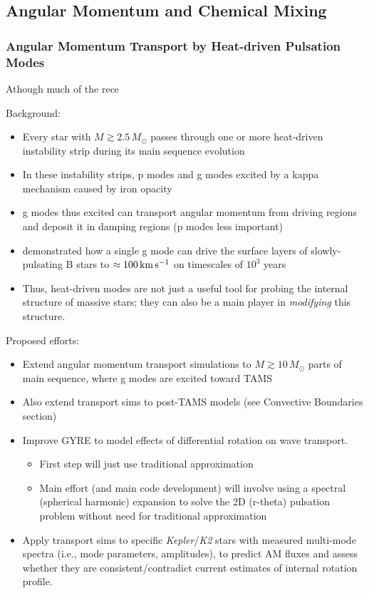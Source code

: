 
\subsection{Angular Momentum and Chemical Mixing}



{\color{brown}
\subsubsection{Angular Momentum Transport by Heat-driven Pulsation Modes}

Athough much of the rece

Background:
 \begin{itemize}
 \item Every star with $M \gtrsim 2.5\,M_{\odot}$ passes through one or more heat-driven instability strip during its main sequence evolution
 \item In these instability strips, p modes and g modes excited by a kappa mechanism caused by iron opacity
 \item g modes thus excited can transport angular momentum from driving regions and deposit it in damping regions (p modes less important)
 \item \citet{Townsend:2017aa} demonstrated how a single g mode can drive the surface layers of slowly-pulsating B stars to $\approx 100\,{\rm km\,s^{-1}}$ on timescales of $10^{3}$ years
 \item Thus, heat-driven modes are not just a useful tool for probing the internal structure of massive stars; they can also be a main player in \emph{modifying} this structure.
 \end{itemize}
 
 Proposed efforts:
 \begin{itemize}
 \item Extend angular momentum transport simulations to $M \gtrsim 10\,M_{\odot}$ parts of main sequence, where g modes are excited toward TAMS
 \item Also extend transport sims to post-TAMS models (see Convective Boundaries section)
 \item Improve GYRE to model effects of differential rotation on wave transport.
 \begin{itemize}
 \item First step will just use traditional approximation
 \item Main effort (and main code development) will involve using a spectral (spherical harmonic) expansion to solve the 2D (r-theta) pulsation problem without need for traditional approximation
 \end{itemize}
 \item Apply transport sims to specific \emph{Kepler}/\emph{K2} stars with measured multi-mode spectra (i.e., mode parameters, amplitudes), to predict AM fluxes and assess whether they are consistent/contradict current estimates of internal rotation profile.
 \end{itemize}


    
}




